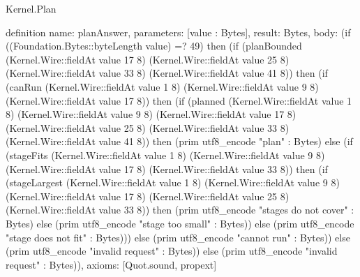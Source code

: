\begin{lexlean}{Kernel.Plan}
\begin{semanticmodule}
definition{
  name: planAnswer,
  parameters: [value : Bytes],
  result: Bytes,
  body: (if ((Foundation.Bytes::byteLength value) =? 49) then (if (planBounded (Kernel.Wire::fieldAt value 17 8) (Kernel.Wire::fieldAt value 25 8) (Kernel.Wire::fieldAt value 33 8) (Kernel.Wire::fieldAt value 41 8)) then (if (canRun (Kernel.Wire::fieldAt value 1 8) (Kernel.Wire::fieldAt value 9 8) (Kernel.Wire::fieldAt value 17 8)) then (if (planned (Kernel.Wire::fieldAt value 1 8) (Kernel.Wire::fieldAt value 9 8) (Kernel.Wire::fieldAt value 17 8) (Kernel.Wire::fieldAt value 25 8) (Kernel.Wire::fieldAt value 33 8) (Kernel.Wire::fieldAt value 41 8)) then (prim utf8_encode "plan" : Bytes) else (if (stageFits (Kernel.Wire::fieldAt value 1 8) (Kernel.Wire::fieldAt value 9 8) (Kernel.Wire::fieldAt value 17 8) (Kernel.Wire::fieldAt value 33 8)) then (if (stageLargest (Kernel.Wire::fieldAt value 1 8) (Kernel.Wire::fieldAt value 9 8) (Kernel.Wire::fieldAt value 17 8) (Kernel.Wire::fieldAt value 25 8) (Kernel.Wire::fieldAt value 33 8)) then (prim utf8_encode "stages do not cover" : Bytes) else (prim utf8_encode "stage too small" : Bytes)) else (prim utf8_encode "stage does not fit" : Bytes))) else (prim utf8_encode "cannot run" : Bytes)) else (prim utf8_encode "invalid request" : Bytes)) else (prim utf8_encode "invalid request" : Bytes)),
  axioms: [Quot.sound, propext]
}
\end{semanticmodule}
\end{lexlean}
